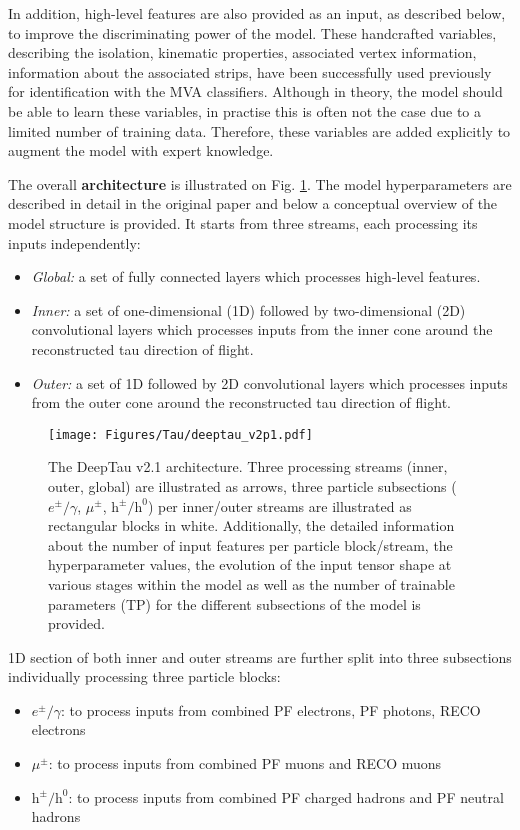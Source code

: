 In addition, high-level features are also provided as an input, as described below, to improve the discriminating power of the model. These handcrafted variables, describing the \tauh isolation, kinematic properties, associated vertex information, information about the associated strips, have been successfully used previously for \tauh identification with the MVA classifiers. Although in theory, the model should be able to learn these variables, in practise this is often not the case due to a limited number of training data. Therefore, these variables are added explicitly to augment the model with expert knowledge. 

The overall \textbf{architecture} is illustrated on Fig. \ref{fig:deeptau_v2p1_arch}. The model hyperparameters are described in detail in the original paper and below a conceptual overview of the model structure is provided. It starts from three streams, each processing its inputs independently: 
\begin{itemize}
    \item \textit{Global:} a set of fully connected layers which processes high-level features.
    \item \textit{Inner:} a set of one-dimensional (1D) followed by two-dimensional (2D) convolutional layers which processes inputs from the inner cone around the reconstructed tau direction of flight.
    \item \textit{Outer:} a set of 1D followed by 2D convolutional layers which processes inputs from the outer cone around the reconstructed tau direction of flight.
\end{itemize}

\begin{figure}[ht!]
    \centering
    \texttt{[image: Figures/Tau/deeptau\_v2p1.pdf]}
    \caption{The DeepTau v2.1 architecture. Three processing streams (inner, outer, global) are illustrated as arrows, three particle subsections ($e^\pm/\gamma$, $\mu^\pm$, $\text{h}^\pm/\text{h}^0$) per inner/outer streams are illustrated as rectangular blocks in white. Additionally, the detailed information about the number of input features per particle block/stream, the hyperparameter values, the evolution of the input tensor shape at various stages within the model as well as the number of trainable parameters (TP) for the different subsections of the model is provided.}
    \label{fig:deeptau_v2p1_arch}
\end{figure}
1D section of both inner and outer streams are further split into three subsections individually processing three particle blocks: 
\begin{itemize}
    \item $e^\pm/\gamma$: to process inputs from combined PF electrons, PF photons, RECO electrons
    \item $\mu^\pm$: to process inputs from combined PF muons and RECO muons
    \item $\text{h}^\pm/\text{h}^0$: to process inputs from combined PF charged hadrons and PF neutral hadrons
\end{itemize}

